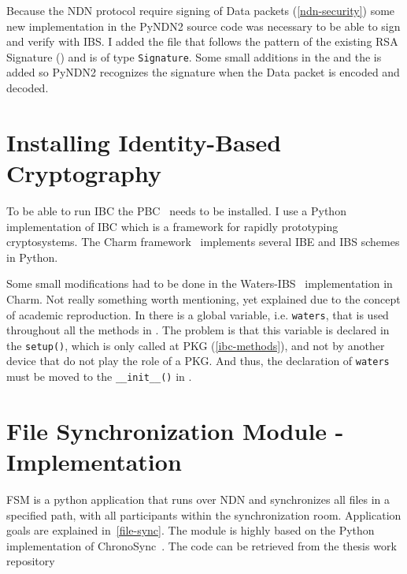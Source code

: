 Because the \gls{NDN} protocol require signing of Data packets (\autoref{ndn-security}) some new implementation in the \gls{PyNDN2} source code was necessary to be able to sign and verify with \gls{IBS}.
I added the  file that follows the pattern of the existing RSA Signature () and is of type \texttt{Signature}.
Some small additions in the  and the  is added so \gls{PyNDN2} recognizes the signature when the Data packet is encoded and decoded.

\section{Installing Identity-Based Cryptography}
To be able to run \gls{IBC} the \gls{PBC}~\cite{ben2007implementation} needs to be installed.
I use a Python implementation of \gls{IBC} which is a framework for rapidly prototyping cryptosystems.
The Charm framework~\cite{charm13} implements several \gls{IBE} and \gls{IBS} schemes in Python.

Some small modifications had to be done in the Waters-\gls{IBS}~\cite{DBLP:journals/iacr/Waters04} implementation in Charm.
Not really something worth mentioning, yet explained due to the concept of academic reproduction. 
In  there is a global variable, i.e. \texttt{waters}, that is used throughout all the methods in .
The problem is that this variable is declared in the \texttt{setup()}, which is only called at \gls{PKG} (\autoref{ibc-methods}), and not by another device that do not play the role of a \gls{PKG}. 
And thus, the declaration of \texttt{waters} must be moved to the \texttt{\_\_init\_\_()} in .


\section{File Synchronization Module - Implementation}
\gls{FSM} is a python application that runs over \gls{NDN} and synchronizes all files in a specified path, with all participants within the synchronization room.
Application goals are explained in~\autoref{file-sync}.
The module is highly based on the Python implementation of ChronoSync~\cite[test-chrono-chat.py]{pyndn2-git}.
The code can be retrieved from the thesis work repository~\cite[fileSync.py]{garseg15}

